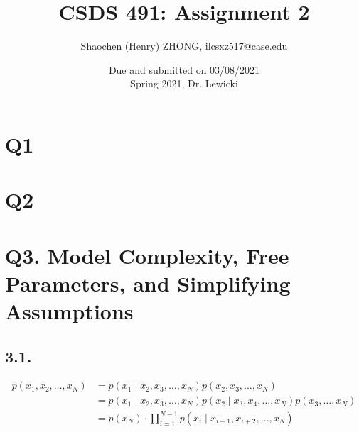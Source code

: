 \documentclass[11pt]{article}
\begin{document}
\title{\textbf{CSDS 491: Assignment 2}}

\author{Shaochen (Henry) ZHONG, ilc{sxz517@case.edu}}

\date{Due and submitted on 03/08/2021 \\ Spring 2021, Dr. Lewicki}
\maketitle


%
%
%
%


\section*{Q1}

\section*{Q2}

\section*{Q3. Model Complexity, Free Parameters, and Simplifying Assumptions}

\subsection*{3.1.}

\begin{align*}
    p(x_1, x_2, \dots, x_N) &= p(x_1 \mid x_2, x_3, \dots, x_N) p(x_2, x_3, \dots, x_N) \\
    &= p(x_1 \mid x_2, x_3, \dots, x_N) p(x_2 \mid x_3, x_4, \dots, x_N) p(x_3, \dots, x_N) \\
    &= p(x_N) \cdot \prod_{i = 1}^{N-1} p(x_i \mid x_{i+1},  x_{i+2}, \dots, x_{N})
\end{align*}
\end{document}
